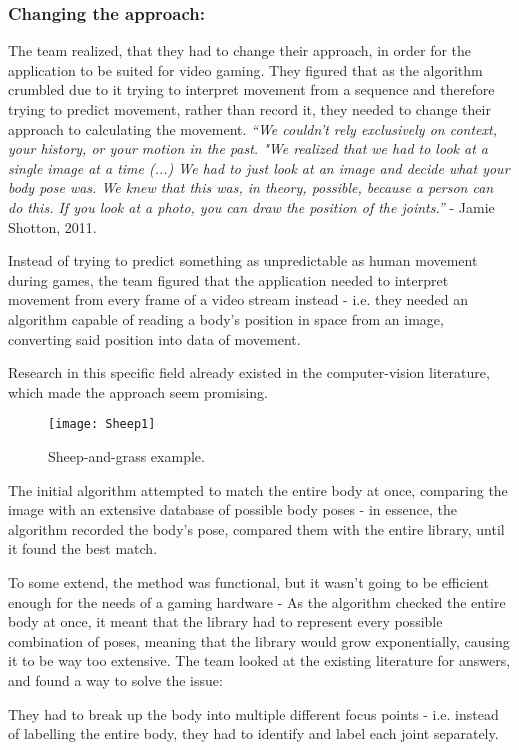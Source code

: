 \subsubsection*{Changing the approach:}
The team realized, that they had to change their approach, in order for the application to be suited for video gaming. They figured that as the algorithm crumbled due to it trying to interpret movement from a sequence and therefore trying to predict movement, rather than record it, they needed to change their approach to calculating the movement. \textit{“We couldn’t rely exclusively on context, your history, or your motion in the past. "We realized that we had to look at a single image at a time (...) We had to just look at an image and decide what your body pose was. We knew that this was, in theory, possible, because a person can do this. If you look at a photo, you can draw the position of the joints.”} - Jamie Shotton, 2011.

Instead of trying to predict something as unpredictable as human movement during games, the team figured that the application needed to interpret movement from every frame of a video stream instead - i.e. they needed an algorithm capable of reading a body's position in space from an image, converting said position into data of movement.

Research in this specific field already existed in the computer-vision literature, which made the approach seem promising.

\begin{figure}[!htbp] 
\centering
\texttt{[image: Sheep1]} 
\caption{Sheep-and-grass example.}
\label{fig:Sheep}
\end{figure}
\bigskip

The initial algorithm attempted to match the entire body at once, comparing the image with an extensive database of possible body poses - in essence, the algorithm recorded the body's pose, compared them with the entire library, until it found the best match.

To some extend, the method was functional, but it wasn't going to be efficient enough for the needs of a gaming hardware - As the algorithm checked the entire body at once, it meant that the library had to represent every possible combination of poses, meaning that the library would grow exponentially, causing it to be way too extensive. \parencite{Knies}
The team looked at the existing literature for answers, and found a way to solve the issue:

They had to break up the body into multiple different focus points - i.e. instead of labelling the entire body, they had to identify and label each joint separately.

